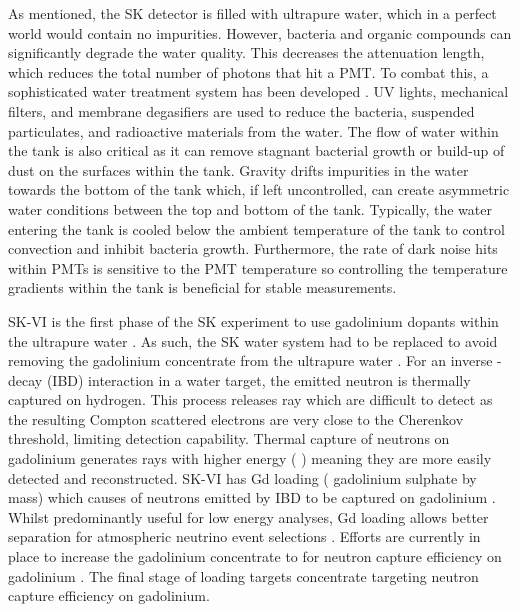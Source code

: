 As mentioned, the SK detector is filled with ultrapure water, which in a perfect world would contain no impurities. However, bacteria and organic compounds can significantly degrade the water quality. This decreases the attenuation length, which reduces the total number of photons that hit a PMT. To combat this, a sophisticated water treatment system has been developed \cite{Fukuda2003-ly, Nakano2020-sb}. UV lights, mechanical filters, and membrane degasifiers are used to reduce the bacteria, suspended particulates, and radioactive materials from the water. The flow of water within the tank is also critical as it can remove stagnant bacterial growth or build-up of dust on the surfaces within the tank. Gravity drifts impurities in the water towards the bottom of the tank which, if left uncontrolled, can create asymmetric water conditions between the top and bottom of the tank.
Typically, the water entering the tank is cooled below the ambient temperature of the tank to control convection and inhibit bacteria growth. Furthermore, the rate of dark noise hits within PMTs is sensitive to the PMT temperature \cite{HamamatsuPMT} so controlling the temperature gradients within the tank is beneficial for stable measurements.

SK-VI is the first phase of the SK experiment to use gadolinium dopants within the ultrapure water \cite{10.5281/zenodo.6694761}. As such, the SK water system had to be replaced to avoid removing the gadolinium concentrate from the ultrapure water \cite{Abe2022-qq}. For an inverse \quickmath{\beta}-decay (IBD) interaction in a water target, the emitted neutron is thermally captured on hydrogen. This process releases  \quickmath{\gamma} ray which are difficult to detect as the resulting Compton scattered electrons are very close to the Cherenkov threshold, limiting detection capability. Thermal capture of neutrons on gadolinium generates \quickmath{\gamma} rays with higher energy ( \cite{Abe2022-ij}) meaning they are more easily detected and reconstructed. SK-VI has  Gd loading ( gadolinium sulphate by mass) which causes  of neutrons emitted by IBD to be captured on gadolinium\cite{PhysRevLett.93.171101,Marti2020-le} . Whilst predominantly useful for low energy analyses, Gd loading allows better \quickmath{\nu/\bar{\nu}} separation for atmospheric neutrino event selections \cite{Marti2019-gu}. Efforts are currently in place to increase the gadolinium concentrate to  for  neutron capture efficiency on gadolinium \cite{Vagins2022-sj}. The final stage of loading targets  concentrate targeting  neutron capture efficiency on gadolinium.


